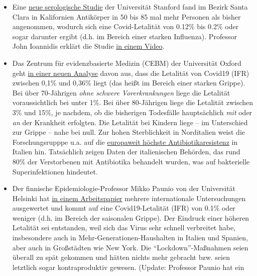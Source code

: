 \begin{itemize}
\tightlist
\item
  Eine
  \href{https://www.medrxiv.org/content/10.1101/2020.04.14.20062463v1}{neue
  serologische Studie} der Universität Stanford fand im Bezirk Santa
  Clara in Kalifornien Antikörper in 50 bis 85 mal mehr Personen als
  bisher angenommen, wodurch sich eine Covid-Letalität von 0.12\% bis
  0.2\% oder sogar darunter ergibt (d.h. im Bereich einer starken
  Influenza). Professor John Ioannidis erklärt die Studie
  \href{https://www.youtube.com/watch?v=jGUgrEfSgaU}{in einem Video}.
\item
  Das Zentrum für evidenzbasierte Medizin (CEBM) der Universität Oxford
  geht
  \href{https://www.cebm.net/covid-19/global-covid-19-case-fatality-rates/}{in
  einer neuen Analyse} davon aus, dass die Letalität von Covid19 (IFR)
  zwischen 0,1\% und 0,36\% liegt (das heißt im Bereich einer starken
  Grippe). Bei über 70-Jährigen \emph{ohne schwere Vorerkrankungen}
  liege die Letalität voraussichtlich bei unter 1\%. Bei über
  80-Jährigen liege die Letalität zwischen 3\% und 15\%, je nachdem, ob
  die bisherigen Todesfälle hauptsächlich \emph{mit} oder \emph{an} der
  Krankheit erfolgten. Die Letalität bei Kindern liege -- im Unterschied
  zur Grippe -- nahe bei null. Zur hohen Sterblichkeit in Norditalien
  weist die Forschungsrupppe u.a. auf die
  \href{https://www.ansa.it/english/news/science_tecnology/2019/11/19/italy-top-in-eu-in-antibiotic-resistance_369e0123-0107-445e-8c17-f11932c9d27c.html}{europaweit
  höchste Antibiotika­resistenz} in Italien hin. Tatsächlich zeigen
  Daten der italienischen Behörden, das rund 80\% der Verstorbenen mit
  Antibiotika behandelt wurden, was auf bakterielle Superinfektionen
  hindeutet.
\item
  Der finnische Epidemiologie-Professor Mikko Paunio von der Universität
  Helsinki hat
  \href{https://lockdownsceptics.org/wp-content/uploads/2020/04/How-the-World-got-Fooled-by-COVID-ed-2c.pdf}{in
  einem Arbeitspapier} mehrere internationale Untersuchungen ausgewertet
  und kommt auf eine Covid19-Letalität (IFR) von 0.1\% oder weniger
  (d.h. im Bereich der saisonalen Grippe). Der Eindruck einer höheren
  Letalität sei entstanden, weil sich das Virus sehr schnell verbreitet
  habe, insbesondere auch in Mehr-Generationen-Haushalten in Italien und
  Spanien, aber auch in Großstädten wie New York. Die
  ``Lockdown''-Maßnahmen seien überall zu spät gekommen und hätten
  nichts mehr gebracht bzw. seien letztlich sogar kontraproduktiv
  gewesen. (Update: Professor Paunio hat ein

\end{itemize}

